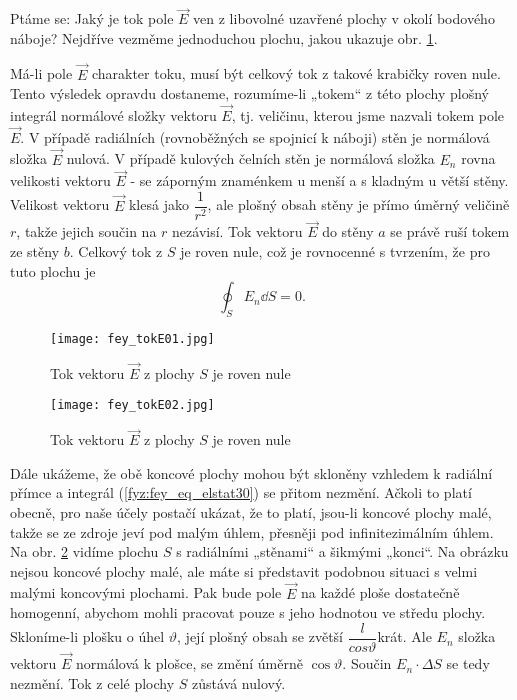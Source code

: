     Ptáme se: Jaký je tok pole \(\vec{E}\) ven z libovolné uzavřené plochy v okolí bodového náboje? 
    Nejdříve vezměme jednoduchou plochu, jakou ukazuje obr. \ref{fyz:fig_fey_tokE01}. 
    
    Má-li pole \(\vec{E}\) charakter toku, musí být celkový tok z takové krabičky roven nule. Tento 
    výsledek opravdu dostaneme, rozumíme-li „tokem“ z této plochy plošný integrál normálové složky 
    vektoru \(\vec{E}\), tj. veličinu, kterou jsme nazvali tokem pole \(\vec{E}\). V případě 
    radiálních (rovnoběžných se spojnicí k náboji) stěn je normálová složka \(\vec{E}\) nulová. V 
    případě kulových čelních stěn je normálová složka \(E_n\) rovna velikosti vektoru \(\vec{E}\) - 
    se záporným znaménkem u menší a s kladným u větší stěny. Velikost vektoru \(\vec{E}\) klesá jako 
    \(\dfrac{1}{r^2}\), ale plošný obsah stěny je přímo úměrný veličině \(r\), takže jejich součin 
    na \(r\) nezávisí. Tok vektoru \(\vec{E}\) do stěny \(a\) se právě ruší tokem ze stěny \(b\). 
    Celkový tok z \(S\) je roven nule, což je rovnocenné s tvrzením, že pro tuto plochu je
    \begin{equation}\label{fyz:fey_eq_elstat30}
    \oint_SE_n\dd{S} = 0.
    \end{equation}
    
    \begin{figure}
      \centering
      \texttt{[image: fey\_tokE01.jpg]}
      \caption{Tok vektoru \(\vec{E}\) z plochy \(S\) je roven nule}
     \label{fyz:fig_fey_tokE01} 
    \end{figure}
    
    \begin{figure}
      \texttt{[image: fey\_tokE02.jpg]}
      \caption{Tok vektoru \(\vec{E}\) z plochy \(S\) je roven nule}
     \label{fyz:fig_fey_tokE02} 
    \end{figure}

    Dále ukážeme, že obě koncové plochy mohou být skloněny vzhledem k radiální přímce a integrál 
    (\ref{fyz:fey_eq_elstat30}) se přitom nezmění. Ačkoli to platí obecně, pro naše účely postačí 
    ukázat, že to platí, jsou-li koncové plochy malé, takže se ze zdroje jeví pod malým úhlem, 
    přesněji pod infinitezimálním úhlem. Na obr. \ref{fyz:fig_fey_tokE02} vidíme plochu \(S\) s 
    radiálními „stěnami“ a šikmými „konci“. Na obrázku nejsou koncové plochy malé, ale máte si 
    představit podobnou situaci s velmi malými koncovými plochami. Pak bude pole \(\vec{E}\) na 
    každé ploše dostatečně homogenní, abychom mohli pracovat pouze s jeho hodnotou ve středu plochy. 
    Skloníme-li plošku o úhel \(\vartheta\), její plošný obsah se zvětší 
    \(\dfrac{l}{cos\vartheta}\)krát. Ale \(E_n\) složka vektoru \(\vec{E}\) normálová k plošce, se 
    změní úměrně \(\cos\vartheta\). Součin \(E_n\cdot\Delta S\) se tedy nezmění. Tok z celé plochy 
    \(S\) zůstává nulový.
      
